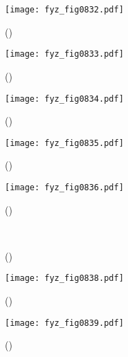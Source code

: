     \begin{figure}[ht!] %
      \centering
      \texttt{[image: fyz\_fig0832.pdf]}
      \caption{
               (\cite[s.~707]{Feynman02})}
      \label{fyz:fig0832}
    \end{figure}
    
    \begin{figure}[ht!] %
      \centering
      \texttt{[image: fyz\_fig0833.pdf]}
      \caption{
               (\cite[s.~707]{Feynman02})}
      \label{fyz:fig0833}
    \end{figure}
    
    \begin{figure}[ht!] %
      \centering
      \texttt{[image: fyz\_fig0834.pdf]}
      \caption{
               (\cite[s.~707]{Feynman02})}
      \label{fyz:fig0834}
    \end{figure}
    
    \begin{figure}[ht!] %
      \centering
      \texttt{[image: fyz\_fig0835.pdf]}
      \caption{
               (\cite[s.~707]{Feynman02})}
      \label{fyz:fig0835}
    \end{figure}
    
    \begin{figure}[ht!] %
      \centering
      \texttt{[image: fyz\_fig0836.pdf]}
      \caption{
               (\cite[s.~707]{Feynman02})}
      \label{fyz:fig0836}
    \end{figure}

    \begin{figure}[ht!] %
      \centering
                     \\
      \caption{
               (\cite[s.~748]{Feynman02})}
      \label{fyz:fig0837}
    \end{figure}

    \begin{figure}[ht!] %
      \centering
      \texttt{[image: fyz\_fig0838.pdf]}
      \caption{
               (\cite[s.~707]{Feynman02})}
      \label{fyz:fig0838}
    \end{figure}

    \begin{figure}[ht!] %
      \centering
      \texttt{[image: fyz\_fig0839.pdf]}
      \caption{
               (\cite[s.~707]{Feynman02})}
      \label{fyz:fig0839}
    \end{figure}

